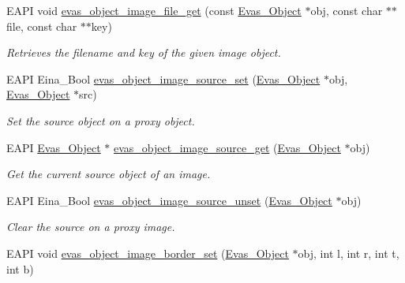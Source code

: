\begin{DoxyCompactItemize}
EAPI void \hyperlink{group__Evas__Object__Image_ga0c3b22438934db6f2b53a30ddd71ef1a}{evas\_\-object\_\-image\_\-file\_\-get} (const \hyperlink{group__Evas__Object__Group_ga9e19e6dd1f517a0ba437c0114d3e7c97}{Evas\_\-Object} $\ast$obj, const char $\ast$$\ast$file, const char $\ast$$\ast$key)
\begin{DoxyCompactList}\small\item\em Retrieves the filename and key of the given image object. \item\end{DoxyCompactList}\item 
EAPI Eina\_\-Bool \hyperlink{group__Evas__Object__Image_ga8f3b7eb8efaa3d77b9908a080b3d4c55}{evas\_\-object\_\-image\_\-source\_\-set} (\hyperlink{group__Evas__Object__Group_ga9e19e6dd1f517a0ba437c0114d3e7c97}{Evas\_\-Object} $\ast$obj, \hyperlink{group__Evas__Object__Group_ga9e19e6dd1f517a0ba437c0114d3e7c97}{Evas\_\-Object} $\ast$src)
\begin{DoxyCompactList}\small\item\em Set the source object on a proxy object. \item\end{DoxyCompactList}\item 
EAPI \hyperlink{group__Evas__Object__Group_ga9e19e6dd1f517a0ba437c0114d3e7c97}{Evas\_\-Object} $\ast$ \hyperlink{group__Evas__Object__Image_ga95a96ced932d6e7e17ee019654d9d901}{evas\_\-object\_\-image\_\-source\_\-get} (\hyperlink{group__Evas__Object__Group_ga9e19e6dd1f517a0ba437c0114d3e7c97}{Evas\_\-Object} $\ast$obj)
\begin{DoxyCompactList}\small\item\em Get the current source object of an image. \item\end{DoxyCompactList}\item 
EAPI Eina\_\-Bool \hyperlink{group__Evas__Object__Image_gad667fc9de032eb39bf07e33ef0f4d81b}{evas\_\-object\_\-image\_\-source\_\-unset} (\hyperlink{group__Evas__Object__Group_ga9e19e6dd1f517a0ba437c0114d3e7c97}{Evas\_\-Object} $\ast$obj)
\begin{DoxyCompactList}\small\item\em Clear the source on a proxy image. \item\end{DoxyCompactList}\item 
EAPI void \hyperlink{group__Evas__Object__Image_ga6283aace5be077433bee45ec23ad072d}{evas\_\-object\_\-image\_\-border\_\-set} (\hyperlink{group__Evas__Object__Group_ga9e19e6dd1f517a0ba437c0114d3e7c97}{Evas\_\-Object} $\ast$obj, int l, int r, int t, int b)

\end{DoxyCompactItemize}
